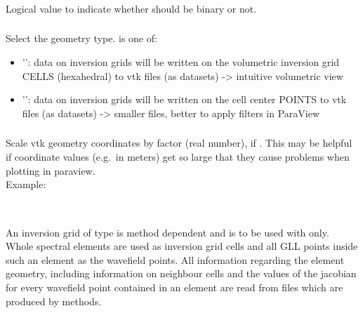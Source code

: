\subsubsection{}
Logical value to indicate whether  should be binary or not.
\subsubsection{}
Select the geometry type.  is one of:
\begin{itemize}
\item[]'': data on inversion grids will be written on the volumetric inversion grid CELLS (hexahedral) to vtk files (as  datasets) -> intuitive volumetric view
\item[]'': data on inversion grids will be written on the cell center POINTS to vtk files (as  datasets) -> smaller files, better to apply filters in ParaView
\end{itemize}
\subsubsection{}
Scale vtk geometry coordinates by factor  (real number), if 
. This may be helpful if coordinate values (e.g.\ in meters) 
get so large that they cause problems when plotting in paraview.\\
Example:\\
\\
%
\subsection{} \label{basic_steps,sec:invgrid,sub:specfem3d}
%
An inversion grid of type  is method dependent and is to be used with 
 only. Whole spectral elements are used as inversion grid cells and all 
GLL points inside such an element as the wavefield points. All information regarding the element 
geometry, including information on neighbour cells and the values of the jacobian for every wavefield 
point contained in an element are read from files which are produced by  methods.


